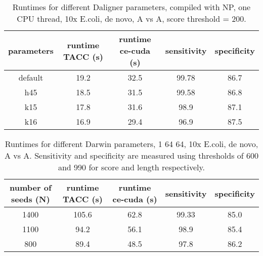 \documentclass[../thesis.tex]{subfiles}
\begin{document}
\begin{table}
\centering
\caption{Runtimes for different Daligner parameters, compiled with NP, one CPU thread, 10x E.coli, de novo, A vs A, score threshold = 200.}
\label{tbl:daligner5}
\begin{tabular}{c|c c c c}
parameters & runtime TACC (s) & runtime ce-cuda (s) & sensitivity & specificity \\ \hline
default & 19.2 & 32.5 & 99.78 & 86.7 \\
h45     & 18.5 & 31.5 & 99.58 & 86.8 \\
k15     & 17.8 & 31.6 & 98.9 & 87.1 \\
k16     & 16.9 & 29.4 & 96.9 & 87.5 \\
\end{tabular}
\end{table}




\begin{table}
\centering
\caption{Runtimes for different Darwin parameters, 1 64 64, 10x E.coli, de novo, A vs A. Sensitivity and specificity are measured using thresholds of 600 and 990 for score and length respectively.}
\label{tbl:darwin4}
\begin{tabular}{c|c c c c}
number of seeds (N) & runtime TACC (s) & runtime ce-cuda (s) & sensitivity & specificity \\ \hline
1400 & 105.6 & 62.8 & 99.33 & 85.0 \\
1100 & 94.2 & 56.1 & 98.9 & 85.4 \\
800 & 89.4 & 48.5 & 97.8 & 86.2 \\
\end{tabular}
\end{table}
\end{document}
